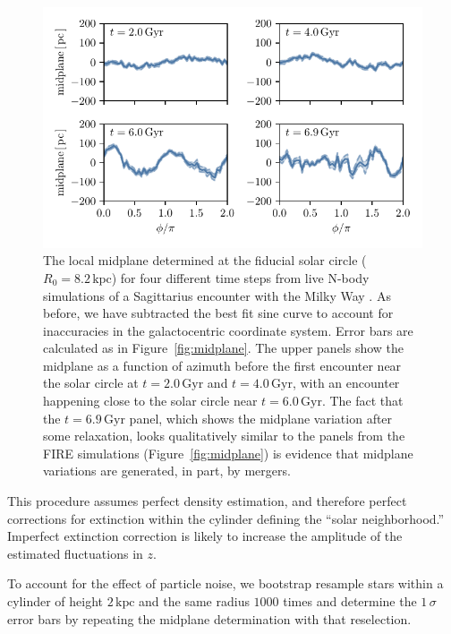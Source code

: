 \documentclass[twocolumn]{aastex62}
\newcommand{\kpc}{\text{kpc}}
\newcommand{\Gyr}{\text{Gyr}}
\begin{document}
\begin{figure}[htb!]
\begin{center}
\includegraphics[width=342.078286667pt]{fig/midplane_fit_chervinsim.pdf}
\end{center}
\caption{The local midplane determined at the fiducial solar circle
($R_0 = 8.2\,\kpc$) for four different time steps from live N-body simulations of a
Sagittarius encounter with the Milky Way \citep{2018MNRAS.481..286L}. As
before, we have subtracted the best fit sine
curve to account
for inaccuracies in the galactocentric coordinate system. Error bars are
calculated as in Figure~\ref{fig:midplane}. The upper panels
show the midplane as a function of azimuth before the first encounter near the
solar circle at $t=2.0\,\Gyr$ and $t=4.0\,\Gyr$, with an encounter happening close to the solar circle near $t=6.0\,\Gyr$. The fact that the $t=6.9\,\Gyr$ panel, which shows the midplane variation after some relaxation,
looks qualitatively similar to the panels from the FIRE simulations
(Figure~\ref{fig:midplane}) is evidence that midplane variations are
generated, in part, by mergers.}
\label{fig:midplane_chervin}
\end{figure}

This procedure assumes perfect density estimation, and therefore perfect
corrections for extinction within the cylinder defining the ``solar
neighborhood.'' Imperfect extinction correction is likely to increase the
amplitude of the estimated fluctuations in $z$.

To account for the effect of particle noise, we bootstrap resample stars
within a cylinder of height $2\,\kpc$ and the same radius $1000$
times and determine the $1\,\sigma$ error bars by repeating the midplane
determination with that reselection.
\end{document}
